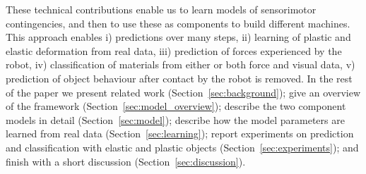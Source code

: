 \documentclass[journal]{IEEEtran}
\newcommand{\comment}[1]{{\color{red} #1}}
\begin{document}
\comment{These technical contributions} enable us to learn models of sensorimotor contingencies, and then to use these as components to build different machines. This approach enables i) predictions over many steps, ii) learning of plastic and elastic deformation from real data, iii) prediction of forces experienced by the robot, iv) classification of materials from either or both force and visual data, v) prediction of object behaviour after contact by the robot is removed. In the rest of the paper we present related work (Section~\ref{sec:background}); give an overview of the framework (Section~\ref{sec:model_overview}); describe the two component models in detail (Section~\ref{sec:model}); describe how the model parameters are learned from real data (Section~\ref{sec:learning}); report experiments on prediction and classification with elastic and plastic objects (Section~\ref{sec:experiments}); and finish with a short discussion (Section~\ref{sec:discussion}).





%
%

\end{document}
